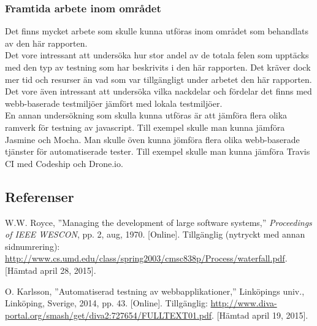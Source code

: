 \subsubsection{Framtida arbete inom området}
Det finns mycket arbete som skulle kunna utföras inom området som behandlats
av den här rapporten.\\

Det vore intressant att undersöka hur stor andel av de totala felen
som upptäcks med den typ av testning som har beskrivits i den här rapporten.
Det kräver dock mer tid och resurser än vad som var tillgängligt under
arbetet den här rapporten.\\

Det vore även intressant att undersöka vilka nackdelar och fördelar det
finns med webb-baserade testmiljöer jämfört med lokala
testmiljöer.\\

En annan undersökning som skulla kunna utföras är att jämföra
flera olika ramverk för testning av javascript. Till exempel skulle
man kunna jämföra Jasmine och Mocha. Man skulle öven kunna jömföra
flera olika webb-baserade tjänster för automatiserade tester. Till
exempel skulle man kunna jämföra Travis CI med Codeship och Drone.io.

\subsection{Referenser}
\vspace{-9mm}
\renewcommand{\refname}{}
\begin{thebibliography}{9}

W.W. Royce, ''Managing the development of large software systems,''
\textit{Proceedings of IEEE WESCON}, pp. 2, aug, 1970.
[Online].
Tillgänglig (nytryckt med annan sidnumrering):
\url{http://www.cs.umd.edu/class/spring2003/cmsc838p/Process/waterfall.pdf}.
[Hämtad april 28, 2015].

O. Karlsson, ''Automatiserad testning av webbapplikationer,''
Linköpings univ., Linköping, Sverige, 2014, pp. 43.
[Online]. 
Tillgänglig: 
\url{http://www.diva-portal.org/smash/get/diva2:727654/FULLTEXT01.pdf}.
[Hämtad april 19, 2015].

\end{thebibliography}
